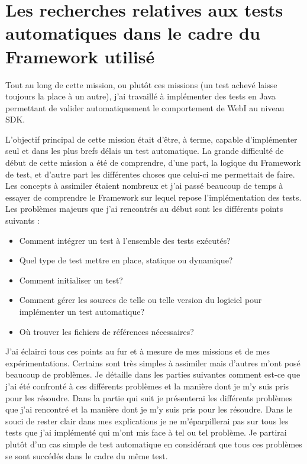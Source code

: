 \section{Les recherches relatives aux tests automatiques dans le cadre du \gls{Framework} utilis\'{e}}

Tout au long de cette mission, ou plut\^{o}t ces missions (un test achev\'{e} laisse toujours la place \`{a} un autre), j'ai travaill\'{e} \`{a} impl\'{e}menter des tests en \gls{Java} permettant de valider automatiquement le comportement de WebI au niveau SDK.

L'objectif principal de cette mission \'{e}tait d'\^{e}tre, \`{a} terme, capable d'impl\'{e}menter seul et dans les plus brefs d\'{e}lais un test automatique. La grande difficult\'{e} de d\'{e}but de cette mission a \'{e}t\'{e} de comprendre, d'une part, la logique du \gls{Framework} de test, et d'autre part les diff\'{e}rentes choses que celui-ci me permettait de faire.\\

Les concepts \`{a} assimiler \'{e}taient nombreux et j'ai pass\'{e} beaucoup de temps \`{a} essayer de comprendre le \gls{Framework} sur lequel repose l'impl\'{e}mentation des tests. Les probl\`{e}mes majeurs que j'ai rencontr\'{e}s au d\'{e}but sont les diff\'{e}rents points suivants :
\begin{itemize}
	\item Comment int\'{e}grer un test \`{a} l'ensemble des tests ex\'{e}cut\'{e}s?
  \item Quel type de test mettre en place, statique ou dynamique?
	\item Comment initialiser un test?
	\item Comment g\'{e}rer les sources de telle ou telle version du logiciel pour impl\'{e}menter un test automatique?
	\item O\`{u} trouver les fichiers de r\'{e}f\'{e}rences n\'{e}cessaires?
\end{itemize}

J'ai \'{e}clairci tous ces points au fur et \`{a} mesure de mes missions et de mes exp\'{e}rimentations. Certains sont tr\`{e}s simples \`{a} assimiler mais d'autres m'ont pos\'{e} beaucoup de probl\`{e}mes. Je d\'{e}taille dans les parties suivantes comment est-ce que j'ai \'{e}t\'{e} confront\'{e} \`{a} ces diff\'{e}rents probl\`{e}mes et la mani\`{e}re dont je m'y suis pris pour les r\'{e}soudre. Dans la partie qui suit je pr\'{e}senterai les diff\'{e}rents probl\`{e}mes que j'ai rencontr\'{e} et la mani\`{e}re dont je m'y suis pris pour les r\'{e}soudre. Dans le souci de rester clair dans mes explications je ne m'\'{e}parpillerai pas sur tous les tests que j'ai impl\'{e}ment\'{e} qui m'ont mis face \`{a} tel ou tel probl\`{e}me. Je partirai plut\^{o}t d'un cas simple de test automatique en consid\'{e}rant que tous ces probl\`{e}mes se sont succ\'{e}d\'{e}s dans le cadre du m\^{e}me test.\\


